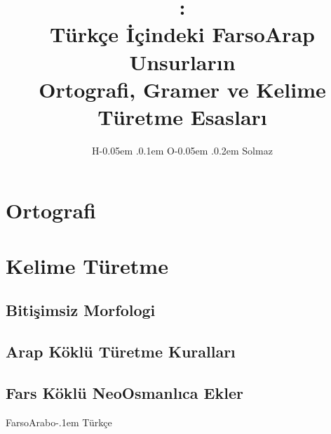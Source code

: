 \documentclass[a5paper,twosided,12pt]{scrbook}
\title{\Huge\fat:\\[0.6ex] \large Türkçe İçindeki FarsoArap Unsurların \\
  Ortografi, Gramer ve Kelime Türetme Esasları}
\author{H\kern -0.05em .\kern 0.1em O\kern -0.05em .\kern 0.2em Solmaz}
\date{}
\newcommand{\fat}{FarsoArabo\kern -.1em Türkçe}
\begin{document}
\maketitle
\tableofcontents

\chapter{Ortografi}

\chapter{Kelime Türetme}
\section{Bitişimsiz Morfologi}

\section{Arap Köklü Türetme Kuralları}

\section{Fars Köklü NeoOsmanlıca Ekler}
\fat
\end{document}
